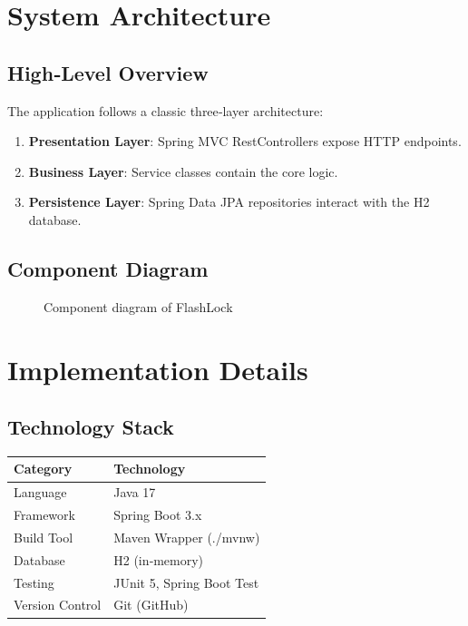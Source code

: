 \documentclass[12pt,a4paper]{report}
\begin{document}
\chapter{System Architecture}
\section{High‑Level Overview}
The application follows a classic three‑layer architecture:
\begin{enumerate}[noitemsep]
    \item \textbf{Presentation Layer}: Spring MVC RestControllers expose HTTP endpoints.
    \item \textbf{Business Layer}: Service classes contain the core logic.
    \item \textbf{Persistence Layer}: Spring Data JPA repositories interact with the H2 database.
\end{enumerate}

\section{Component Diagram}
\begin{figure}[H]
    \centering
    \caption{Component diagram of FlashLock}
    \label{fig:component}
\end{figure}

\chapter{Implementation Details}
\section{Technology Stack}
\begin{tabular}{ll}
    \toprule
    Category & Technology \\ \midrule
    Language & Java 17 \\
    Framework & Spring Boot 3.x \\
    Build Tool & Maven Wrapper (./mvnw) \\
    Database & H2 (in‑memory) \\
    Testing & JUnit 5, Spring Boot Test \\
    Version Control & Git (GitHub) \\
    \bottomrule
\end{tabular}
\end{document}
